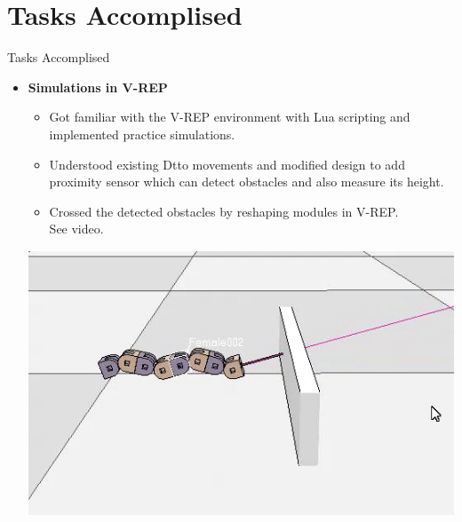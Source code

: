 \documentclass[10pt, a4paper]{beamer}
\begin{document}
\section{Tasks Accomplised}
\begin{frame}{Tasks Accomplised}
	\begin{itemize}
		\item \textbf{Simulations in V-REP}
		    \begin{itemize}
		    \item Got familiar with the V-REP environment with Lua scripting and implemented practice simulations.
		    \item Understood existing Dtto movements and modified design to add proximity sensor which can detect obstacles and also measure its height.
		    \item Crossed the detected obstacles by reshaping modules in V-REP. \\ See video.
             \end{itemize}
             \centering\includegraphics[scale=0.45]{detect.png}
	\end{itemize}
\end{frame}
\end{document}
